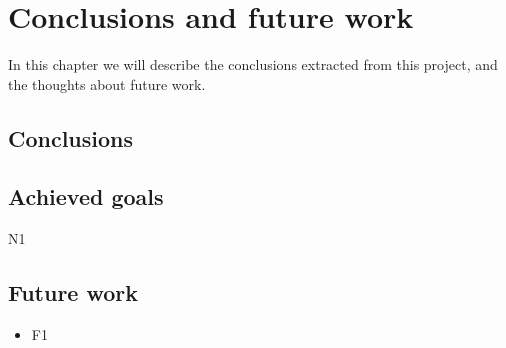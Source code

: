 \chapter{Conclusions and future work}
\label{chap:conclusions}
In this chapter we will describe the conclusions extracted from this project, and the thoughts about future work.

\section{Conclusions}
\label{sec:conclusions}

\section{Achieved goals}
\label{sec:achieved-goals}
\begin{description}
\item N1
\end{description}

\section{Future work}
\label{sec:future-work}

\begin{itemize}

\item F1

\end{itemize}
